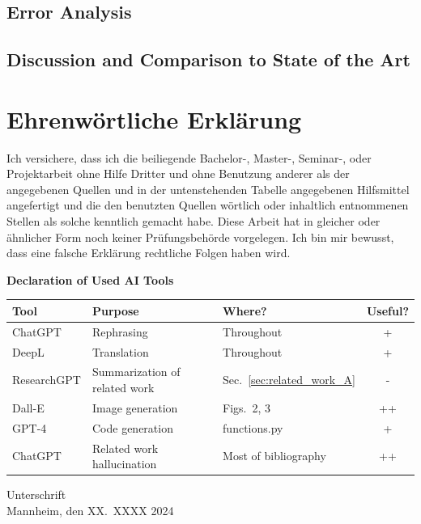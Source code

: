 \documentclass[a4paper,oneside,bibliography=totoc]{scrbook}
\begin{document}
\section{Error Analysis}
\label{sec:eval:errors}

\section{Discussion and Comparison to State of the Art}
\label{sec:eval:discussion}




\appendix

\backmatter
\chapter{Ehrenwörtliche Erklärung}

Ich versichere, dass ich die beiliegende Bachelor-, Master-, Seminar-, oder
Projektarbeit ohne Hilfe Dritter und ohne Benutzung anderer als der angegebenen
Quellen und in der untenstehenden Tabelle angegebenen Hilfsmittel angefertigt
und die den benutzten Quellen wörtlich oder inhaltlich entnommenen Stellen als
solche kenntlich gemacht habe. Diese Arbeit hat in gleicher oder ähnlicher Form
noch keiner Prüfungsbehörde vorgelegen. Ich bin mir bewusst, dass eine falsche
Erklärung rechtliche Folgen haben wird.

\begin{center}
  \textbf{Declaration of Used AI Tools} \\[.3em]
  \begin{tabularx}{\textwidth}{lXlc}
    \toprule
    Tool & Purpose & Where? & Useful? \\
    \midrule
    ChatGPT & Rephrasing & Throughout & + \\
    DeepL & Translation & Throughout & + \\
    ResearchGPT & Summarization of related work & Sec.~\ref{sec:related_work_A} & - \\
    Dall-E & Image generation & Figs.~2, 3 & ++ \\
    GPT-4 & Code generation & functions.py & + \\
    ChatGPT & Related work hallucination & Most of bibliography & ++ \\
    \bottomrule
  \end{tabularx}
\end{center}

\vspace{2cm}
\noindent Unterschrift\\
\noindent Mannheim, den XX.~XXXX 2024 \hfill
\end{document}
